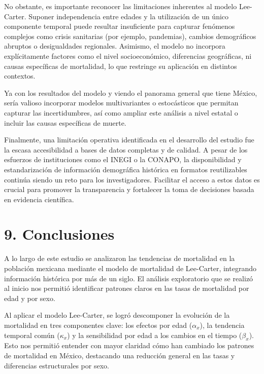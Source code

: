 \documentclass[
]{article}
\begin{document}
No obstante, es importante reconocer las limitaciones inherentes al
modelo Lee-Carter. Suponer independencia entre edades y la utilización
de un único componente temporal puede resultar insuficiente para
capturar fenómenos complejos como crisis sanitarias (por ejemplo,
pandemias), cambios demográficos abruptos o desigualdades regionales.
Asimismo, el modelo no incorpora explícitamente factores como el nivel
socioeconómico, diferencias geográficas, ni causas específicas de
mortalidad, lo que restringe su aplicación en distintos contextos.

Ya con los resultados del modelo y viendo el panorama general que tiene
México, sería valioso incorporar modelos multivariantes o estocásticos
que permitan capturar las incertidumbres, así como ampliar este análisis
a nivel estatal o incluir las causas específicas de muerte.

Finalmente, una limitación operativa identificada en el desarrollo del
estudio fue la escasa accesibilidad a bases de datos completas y de
calidad. A pesar de los esfuerzos de instituciones como el INEGI o la
CONAPO, la disponibilidad y estandarización de información demográfica
histórica en formatos reutilizables continúa siendo un reto para los
investigadores. Facilitar el acceso a estos datos es crucial para
promover la transparencia y fortalecer la toma de decisiones basada en
evidencia científica.

\clearpage

\hypertarget{conclusiones-1}{%
\section{9. Conclusiones}\label{conclusiones-1}}

A lo largo de este estudio se analizaron las tendencias de mortalidad en
la población mexicana mediante el modelo de mortalidad de Lee-Carter,
integrando información histórica por más de un siglo. El análisis
exploratorio que se realizó al inicio nos permitió identificar patrones
claros en las tasas de mortalidad por edad y por sexo.

Al aplicar el modelo Lee-Carter, se logró descomponer la evolución de la
mortalidad en tres componentes clave: los efectos por edad
(\(\alpha_x\)), la tendencia temporal común (\(\kappa_x\)) y la
sensibilidad por edad a los cambios en el tiempo (\(\beta_x\)). Esto nos
permitió entender con mayor claridad cómo han cambiado los patrones de
mortalidad en México, destacando una reducción general en las tasas y
diferencias estructurales por sexo.
\end{document}
